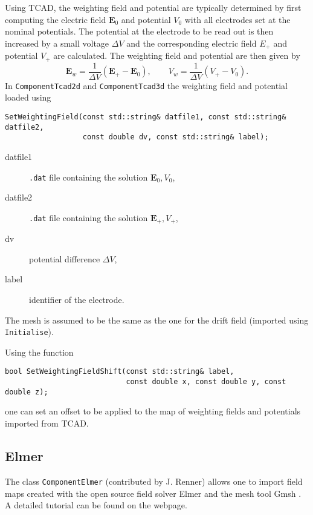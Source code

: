 Using TCAD, the weighting field and potential are typically determined 
by first computing the electric field $\mathbf{E}_{0}$ and potential 
$V_{0}$ with all electrodes set at the nominal potentials.
The potential at the electrode to be read out is then increased by a 
small voltage $\Delta V$ and the corresponding electric field $E_{+}$ and 
potential $V_{+}$ are calculated. The weighting field and potential 
are then given by 
\begin{equation*}
  \mathbf{E}_{w} = \frac{1}{\Delta V}\left(\mathbf{E}_{+} - \mathbf{E}_{0}\right), \qquad V_{w} = \frac{1}{\Delta V}\left(V_{+} - V_{0}\right).
\end{equation*}
In \texttt{ComponentTcad2d} and \texttt{ComponentTcad3d} the weighting 
field and potential loaded using
\begin{lstlisting} 
SetWeightingField(const std::string& datfile1, const std::string& datfile2,
                  const double dv, const std::string& label); 
\end{lstlisting}
\begin{description}
  \item[datfile1] \texttt{.dat} file containing the solution $\mathbf{E}_0, V_0$,
  \item[datfile2] \texttt{.dat} file containing the solution $\mathbf{E}_+, V_+$,
  \item[dv] potential difference $\Delta V$,
  \item[label] identifier of the electrode.
\end{description}
The mesh is assumed to be the same as the one for the drift field 
(imported using \texttt{Initialise}).

Using the function
\begin{lstlisting}
bool SetWeightingFieldShift(const std::string& label,
                            const double x, const double y, const double z);
\end{lstlisting}
one can set an offset to be applied to the map of weighting fields and potentials imported from TCAD.

\subsection{Elmer}

The class \texttt{ComponentElmer} (contributed by J. Renner) allows one to import 
field maps created with the open source field solver Elmer \cite{Elmer}
and the mesh tool Gmsh \cite{Gmsh}. 
A detailed tutorial can be found on the webpage. 

